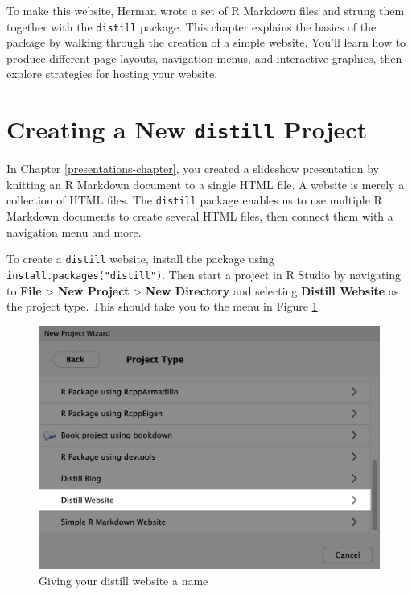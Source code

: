 \documentclass[
]{book}
\begin{document}
To make this website, Herman wrote a set of R Markdown files and strung them together with the \texttt{distill} package. This chapter explains the basics of the package by walking through the creation of a simple website. You'll learn how to produce different page layouts, navigation menus, and interactive graphics, then explore strategies for hosting your website.

\hypertarget{creating-a-new-distill-project}{%
\section*{\texorpdfstring{Creating a New \texttt{distill} Project}{Creating a New distill Project}}\label{creating-a-new-distill-project}}

In Chapter \ref{presentations-chapter}, you created a slideshow presentation by knitting an R Markdown document to a single HTML file. A website is merely a collection of HTML files. The \texttt{distill} package enables us to use multiple R Markdown documents to create several HTML files, then connect them with a navigation menu and more.

To create a \texttt{distill} website, install the package using \texttt{install.packages("distill")}. Then start a project in R Studio by navigating to \textbf{File} \textgreater{} \textbf{New Project} \textgreater{} \textbf{New Directory} and selecting \textbf{Distill Website} as the project type. This should take you to the menu in Figure \ref{fig:new-distill-website}.

\begin{figure}
\includegraphics[width=1\linewidth]{assets/new-distill-website} \caption{Giving your distill website a name}\label{fig:new-distill-website}
\end{figure}
\end{document}
